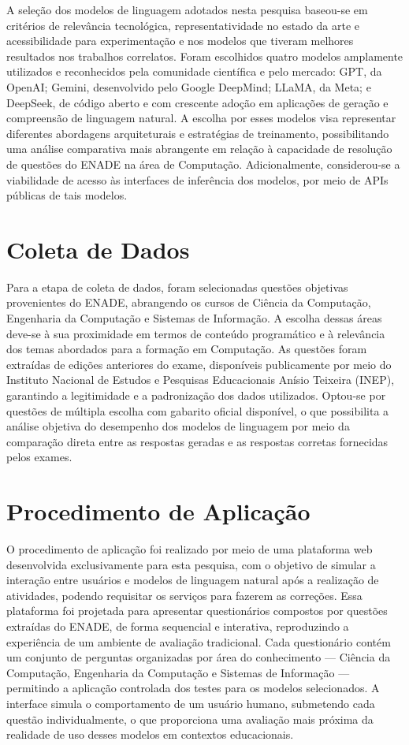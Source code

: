 A seleção dos modelos de linguagem adotados nesta pesquisa baseou-se em critérios de relevância tecnológica, representatividade no estado da arte e acessibilidade para experimentação e nos modelos que tiveram melhores resultados nos trabalhos correlatos. Foram escolhidos quatro modelos amplamente utilizados e reconhecidos pela comunidade científica e pelo mercado: GPT, da OpenAI; Gemini, desenvolvido pelo Google DeepMind; LLaMA, da Meta; e DeepSeek, de código aberto e com crescente adoção em aplicações de geração e compreensão de linguagem natural. A escolha por esses modelos visa representar diferentes abordagens arquiteturais e estratégias de treinamento, possibilitando uma análise comparativa mais abrangente em relação à capacidade de resolução de questões do ENADE na área de Computação. Adicionalmente, considerou-se a viabilidade de acesso às interfaces de inferência dos modelos, por meio de APIs públicas de tais modelos.

\section{Coleta de Dados}

Para a etapa de coleta de dados, foram selecionadas questões objetivas provenientes do ENADE, abrangendo os cursos de Ciência da Computação, Engenharia da Computação e Sistemas de Informação. A escolha dessas áreas deve-se à sua proximidade em termos de conteúdo programático e à relevância dos temas abordados para a formação em Computação. As questões foram extraídas de edições anteriores do exame, disponíveis publicamente por meio do Instituto Nacional de Estudos e Pesquisas Educacionais Anísio Teixeira (INEP), garantindo a legitimidade e a padronização dos dados utilizados. Optou-se por questões de múltipla escolha com gabarito oficial disponível, o que possibilita a análise objetiva do desempenho dos modelos de linguagem por meio da comparação direta entre as respostas geradas e as respostas corretas fornecidas pelos exames. 

\section{Procedimento de Aplicação}

O procedimento de aplicação foi realizado por meio de uma plataforma web desenvolvida exclusivamente para esta pesquisa, com o objetivo de simular a interação entre usuários e modelos de linguagem natural após a realização de atividades, podendo requisitar os serviços para fazerem as correções. Essa plataforma foi projetada para apresentar questionários compostos por questões extraídas do ENADE, de forma sequencial e interativa, reproduzindo a experiência de um ambiente de avaliação tradicional. Cada questionário contém um conjunto de perguntas organizadas por área do conhecimento — Ciência da Computação, Engenharia da Computação e Sistemas de Informação — permitindo a aplicação controlada dos testes para os modelos selecionados. A interface simula o comportamento de um usuário humano, submetendo cada questão individualmente, o que proporciona uma avaliação mais próxima da realidade de uso desses modelos em contextos educacionais.

